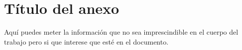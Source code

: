 \chapter{Título del anexo} \label{ap:montaje}

Aquí puedes meter la información que no sea imprescindible en el cuerpo del trabajo pero si que interese que esté en el documento.